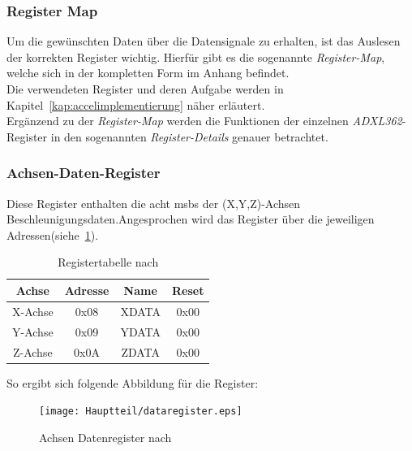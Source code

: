 \subsubsection{Register Map}\label{kap:registermap}

Um die gewünschten Daten über die Datensignale zu erhalten, ist das Auslesen der korrekten Register wichtig.
Hierfür gibt es die sogenannte \emph{Register-Map}, welche sich in der kompletten Form im Anhang befindet.\\

Die verwendeten Register und deren Aufgabe werden in Kapitel~\ref{kap:accelimplementierung} näher erläutert.\\
Ergänzend zu der \emph{Register-Map} werden die Funktionen der einzelnen \emph{ADXL362}-Register in den sogenannten
\emph{Register-Details} genauer betrachtet.

\subsubsection{Achsen-Daten-Register}\label{kap:achsendatenregister}

Diese Register enthalten die acht \acp{msb} der (X,Y,Z)-Achsen Beschleunigungsdaten.Angesprochen wird das Register über
die jeweiligen Adressen(siehe~\ref{tab:achsendatenregister}).\\

\begin{table}[h]
\centering
\begin{tabular}{c|c|c|c}
\toprule
\multicolumn{1}{c|}{\textbf{Achse}} & \multicolumn{1}{c|}{\textbf{Adresse}} & \multicolumn{1}{c|}{\textbf{Name}} & \multicolumn{1}{c}{\textbf{Reset}} \\
\midrule
\centering
X-Achse & 0x08 & XDATA & 0x00 \\
\hline
Y-Achse & 0x09 & YDATA & 0x00 \\
\hline
Z-Achse & 0x0A & ZDATA & 0x00 \\
\bottomrule
\end{tabular}
\caption{Registertabelle nach \cite{accelerometer}}
\label{tab:achsendatenregister}
\end{table}

 So ergibt sich folgende Abbildung für die Register:\\

 \begin{figure}[h!]
 \centering
 \texttt{[image: Hauptteil/dataregister.eps]}
 \caption{Achsen Datenregister nach \cite{accelerometer} }
 \label{fig:dataregister}
 \end{figure}



